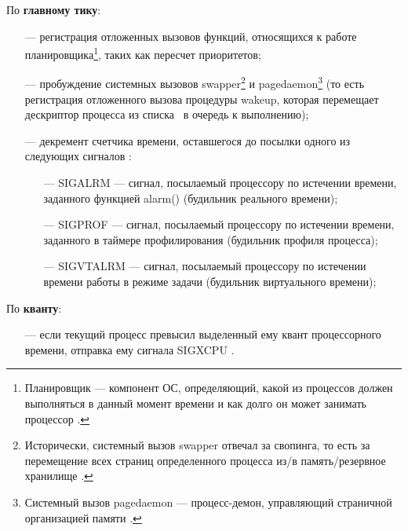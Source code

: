\newpage

По \textbf{главному тику}:

\begin{itemize}
    \item[---] регистрация отложенных вызовов функций, относящихся к работе планировщика\footnote{Планировщик --- компонент ОС, определяющий, какой из процессов должен выполняться в данный момент времени и как долго он может занимать процессор \cite{unix3}.}, таких как пересчет приоритетов;
    
    \item[---] пробуждение системных вызовов {\ttfamily swapper}\footnote{Исторически, системный вызов  {\ttfamily swapper} отвечал за  свопинга\guillemotright, то есть за перемещение всех страниц определенного процесса из/в память/резервное хранилище \cite{swapper}.} и {\ttfamily pagedaemon}\footnote{Системный вызов {\ttfamily pagedaemon} --- процесс-демон, управляющий страничной организацией памяти \cite{pagedaemon}.} (то есть регистрация отложенного вызова процедуры {\ttfamily wakeup}, которая перемещает дескриптор процесса из списка \guillemotright~в очередь  к выполнению\guillemotright);
    
     \item[---] декремент счетчика времени, оставшегося до посылки одного из следующих сигналов \cite{unix4}:
     \begin{itemize}
         \item[---] {\ttfamily SIGALRM} --- сигнал, посылаемый процессору по истечении времени, заданного функцией {\ttfamily alarm()} (будильник реального времени);
         
         \item[---] {\ttfamily SIGPROF} --- сигнал, посылаемый процессору по истечении времени, заданного в таймере профилирования (будильник профиля процесса);

         \item[---] {\ttfamily SIGVTALRM} --- сигнал, посылаемый процессору по истечении времени работы в режиме задачи (будильник виртуального времени);
     \end{itemize}
\end{itemize}

По \textbf{кванту}:

\begin{itemize}
    \item[---] если текущий процесс превысил выделенный ему квант процессорного времени, отправка ему сигнала {\ttfamily SIGXCPU} \cite{unix1}.
\end{itemize}

